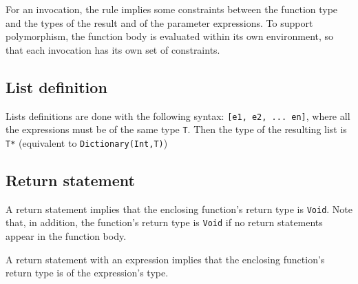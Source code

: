 \documentclass[11pt]{report}
\begin{document}
For an invocation, the rule implies some constraints between the function type and the types of the result and of the parameter expressions. To support polymorphism, the function body is evaluated within its own environment, so that each invocation has its own set of constraints.

\begin{center}
  
\DP
\end{center}

\subsection{List definition}

Lists definitions are done with the following syntax: \texttt{[e1, e2, ... en]}, where all the expressions must be of the same type \texttt{T}. Then the type of the resulting list is \texttt{T*} (equivalent to \texttt{Dictionary(Int,T)})

\begin{center}
\DP
\end{center}

\subsection{Return statement}

A return statement implies that the enclosing function's return type is \texttt{Void}. Note that, in addition, the function's return type is \texttt{Void} if no return statements appear in the function body.

\begin{center}
\DP
\end{center}

A return statement with an expression implies that the enclosing function's return type is of the expression's type.

\begin{center}
  
\DP
\end{center}
\end{document}
